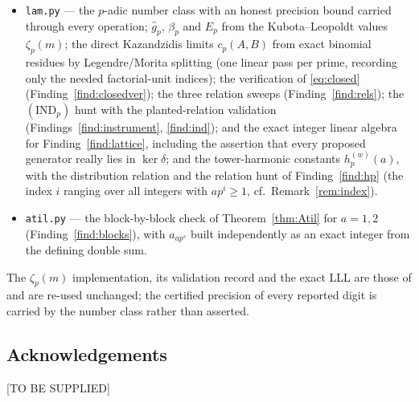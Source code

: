 \documentclass[11pt,reqno]{article}
\newcommand{\gh}{\widehat{g}_p}
\newcommand{\bet}{\beta_p}
\theoremstyle{plain}
\theoremstyle{definition}
\theoremstyle{remark}
\numberwithin{equation}{section}
\begin{document}
\begin{itemize}[leftmargin=1.5em]
\item \texttt{lam.py} --- the $p$-adic number class with an honest precision
  bound carried through every operation; $\gh$, $\bet$ and $E_p$ from the
  Kubota--Leopoldt values $\zeta_p(m)$; the direct Kazandzidis limits
  $c_p(A,B)$ from exact binomial residues by Legendre/Morita splitting (one
  linear pass per prime, recording only the needed factorial-unit indices); the
  verification of \eqref{eq:closed} (Finding~\ref{find:closedver}); the three
  relation sweeps (Finding~\ref{find:rels}); the $(\mathrm{IND}_p)$ hunt with the
  planted-relation validation (Findings~\ref{find:instrument},
  \ref{find:ind}); and the exact integer linear algebra for
  Finding~\ref{find:lattice}, including the assertion that every proposed
  generator really lies in $\ker\delta$; and the tower-harmonic constants
  $h^{(w)}_p(a)$, with the distribution relation and the relation hunt of
  Finding~\ref{find:hp} (the index $i$ ranging over all integers with
  $ap^i\ge1$, cf.\ Remark~\ref{rem:index}).
\item \texttt{atil.py} --- the block-by-block check of Theorem~\ref{thm:Atil}
  for $a=1,2$ (Finding~\ref{find:blocks}), with $a_{ap^s}$ built independently as
  an exact integer from the defining double sum.
\end{itemize}

The $\zeta_p(m)$ implementation, its validation record and the exact LLL are
those of \cite[App.~A]{PaperC} and are re-used unchanged; the certified
precision of every reported digit is carried by the number class rather than
asserted.

\subsection*{Acknowledgements}

[TO BE SUPPLIED]
\end{document}

